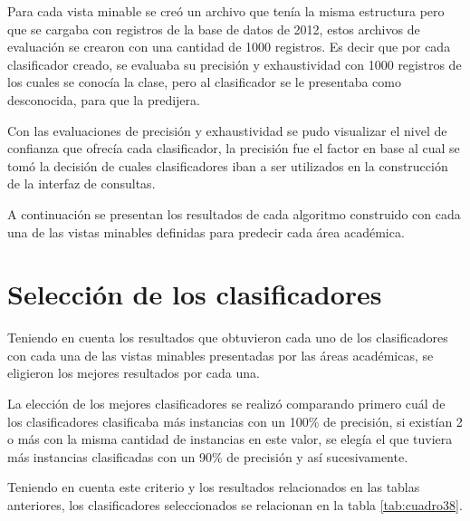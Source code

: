 Para cada vista minable se creó un archivo que tenía la misma estructura pero que se cargaba con registros de la base de datos de 2012, estos archivos de evaluación se crearon con una cantidad de 1000 registros. Es decir que por cada clasificador creado, se evaluaba su precisión y exhaustividad con 1000 registros de los cuales se conocía la clase, pero al clasificador se le presentaba como desconocida, para que la predijera.

Con las evaluaciones de precisión y exhaustividad se pudo visualizar el nivel de confianza que ofrecía cada clasificador, la precisión fue el factor en base al cual se tomó la decisión de cuales clasificadores iban a ser utilizados en la construcción de la interfaz de consultas.

A continuación se presentan los resultados de cada algoritmo construido con cada una de las vistas minables definidas para predecir cada área académica.


\section{Selección de los clasificadores}
Teniendo en cuenta los resultados que obtuvieron cada uno de los clasificadores con cada una de las vistas minables presentadas por las áreas académicas, se eligieron los mejores resultados por cada una.

La elección de los mejores clasificadores se realizó comparando primero cuál de los clasificadores clasificaba más instancias con un 100\% de precisión, si existían 2 o más con la misma cantidad de instancias en este valor, se elegía el que tuviera más instancias clasificadas con un 90\% de precisión y así sucesivamente.

Teniendo en cuenta este criterio y los resultados relacionados en las tablas anteriores, los clasificadores seleccionados se relacionan en la tabla \ref{tab:cuadro38}.

